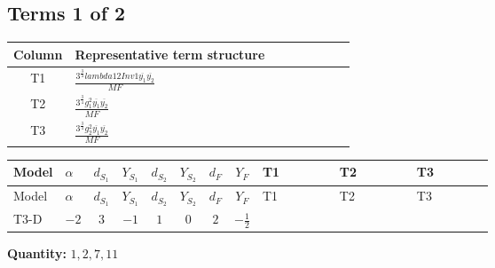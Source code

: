 \documentclass[8pt]{article}
\begin{document}
\begin{landscape}
\subsection*{Terms 1 of 2}
\begin{center}
\begin{tabular}{@{}c >{\raggedright\arraybackslash}p{0.82\linewidth}@{}}
\toprule
Column & Representative term structure \\
\midrule
T1 & \(\displaystyle \frac{3^{\frac{3}{4}} lambda12Inv1 \overline{y_{1}} \overline{y_{2}}}{MF}\) \\
\midrule
T2 & \(\displaystyle \frac{3^{\frac{3}{4}} g_{1}^{2} \overline{y_{1}} \overline{y_{2}}}{MF}\) \\
\midrule
T3 & \(\displaystyle \frac{3^{\frac{3}{4}} g_{2}^{2} \overline{y_{1}} \overline{y_{2}}}{MF}\) \\
\midrule
\bottomrule
\end{tabular}
\end{center}
\smallskip
\tiny
\begin{longtable}{@{}llcccccc >{\raggedright\arraybackslash}p{0.21\linewidth} >{\raggedright\arraybackslash}p{0.21\linewidth} >{\raggedright\arraybackslash}p{0.21\linewidth}@{}}
\toprule
Model & $\alpha$ & $d_{S_1}$ & $Y_{S_1}$ & $d_{S_2}$ & $Y_{S_2}$ & $d_F$ & $Y_F$ & T1 & T2 & T3 \\
\midrule
\endfirsthead
\toprule
Model & $\alpha$ & $d_{S_1}$ & $Y_{S_1}$ & $d_{S_2}$ & $Y_{S_2}$ & $d_F$ & $Y_F$ & T1 & T2 & T3 \\
\midrule
\endhead
T3-D & $-2$ & $3$ & $-1$ & $1$ & $0$ & $2$ & $-\frac{1}{2}$ & \scriptsize\adjustbox{max width=\linewidth}{$\begin{gathered} \frac{3^{\frac{3}{4}} lambda12Inv1 \overline{y_{1}} \overline{y_{2}}}{6 MF}\end{gathered}$} & \scriptsize\adjustbox{max width=\linewidth}{$\begin{gathered} \frac{3^{\frac{3}{4}} g_{1}^{2} \overline{y_{1}} \overline{y_{2}}}{8 MF}\end{gathered}$} & \scriptsize\adjustbox{max width=\linewidth}{$\begin{gathered} \frac{25 \cdot 3^{\frac{3}{4}} g_{2}^{2} \overline{y_{1}} \overline{y_{2}}}{24 MF}\end{gathered}$} \\
\midrule
\bottomrule
\end{longtable}
\clearpage
\noindent\textbf{Quantity: }$\mathrm{1,2,7,11}$\par\smallskip

\end{landscape}
\end{document}
